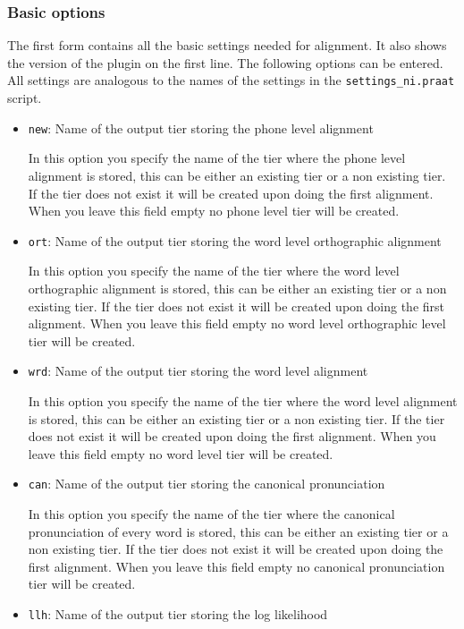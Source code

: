 \subsubsection{Basic options}	
The first form contains all the basic settings needed for alignment. It also
shows the version of the plugin on the first line. The following options can be
entered. All settings are analogous to the names of the settings in the
\texttt{settings\_ni.praat} script.
\begin{itemize}
	\item \texttt{new}: %
		Name of the output tier storing the phone level alignment

		In this option you specify the name of the tier where the phone level
		alignment is stored, this can be either an existing tier or a non existing
		tier. If the tier does not exist it will be created upon doing the first
		alignment. When you leave this field empty no phone level tier will be
		created.
	\item \texttt{ort}: %
		Name of the output tier storing the word level orthographic alignment

		In this option you specify the name of the tier where the word level
		orthographic alignment is stored, this can be either an existing tier
		or a non existing tier. If the tier does not exist it will be created
		upon doing the first alignment. When you leave this field empty no
		word level orthographic level tier will be created.
	\item \texttt{wrd}: %
		Name of the output tier storing the word level alignment

		In this option you specify the name of the tier where the word level
		alignment is stored, this can be either an existing tier or a non existing
		tier. If the tier does not exist it will be created upon doing the first
		alignment. When you leave this field empty no word level tier will be
		created.
	\item \texttt{can}: %
		Name of the output tier storing the canonical pronunciation

		In this option you specify the name of the tier where the canonical
		pronunciation of every word is stored, this can be either an existing tier
		or a non existing tier. If the tier does not exist it will be created upon
		doing the first alignment. When you leave this field empty no canonical
		pronunciation tier will be created.
	\item \texttt{llh}: %
		Name of the output tier storing the log likelihood


\end{itemize}

